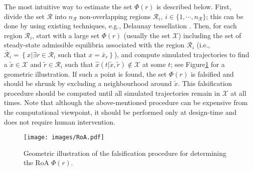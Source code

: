 \documentclass[1p,times]{elsarticle}
\begin{document}
The most intuitive way to estimate the set $\Phi(r)$ is described below. First, divide the set $\mathcal{R}$ into $n_{\mathcal{R}}$ non-overlapping regions $\mathcal{R}_i,~i\in\{1,\cdots,n_{\mathcal{R}}\}$; this can be done by using existing techniques, e.g., Delaunay tessellation \cite{Watson1981,Lawson1986}. Then, for each region $\mathcal{R}_i$, start with a large set $\Phi(r)$ (usually the set $\mathcal{X}$) including the set of steady-state admissible equilibria associated with the region $\mathcal{R}_i$ (i.e., $\bar{\mathcal{R}}_i=\left\{x|\exists r\in\mathcal{R}_i\text{ such that }x=\bar{x}_r\right\}$), and compute simulated trajectories to find a $\tilde{x}\in\mathcal{X}$ and $\tilde{r}\in\mathcal{R}_i$ such that $\hat{x}(t|\tilde{x},\tilde{r})\not\in\mathcal{X}$ at some $t$; see Figure\ref{fig:RoA} for a geometric illustration. If such a point is found, the set $\Phi(r)$ is falsified and should be shrunk by excluding a neighbourhood around $\tilde{x}$. This falsification procedure should be computed until all simulated trajectories remain in $\mathcal{X}$ at all times. Note that although the above-mentioned procedure can be expensive from the computational viewpoint, it should be performed only at design-time and does not require human intervention.

\begin{figure}[!h]
    \centering
    \texttt{[image: images/RoA.pdf]}
    \caption{{{\color{blue}}Geometric illustration of the falsification procedure for determining the RoA $\Phi(r)$.}}
    \label{fig:RoA}
\end{figure}
\end{document}
